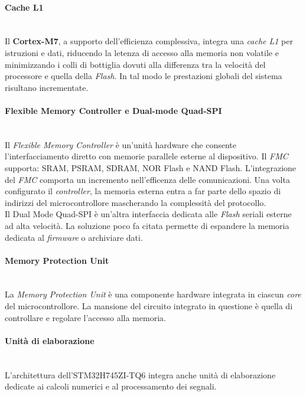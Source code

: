 \paragraph{\small{Cache L1}}\mbox{}\\
Il \textbf{Cortex-M7}, a supporto dell'efficienza complessiva, integra una \textit{cache L1} per istruzioni e dati, riducendo la letenza di accesso alla memoria non volatile e minimizzando i colli di bottiglia dovuti alla differenza tra la velocità del processore e quella della \textit{Flash}. In tal modo le prestazioni globali del sistema risultano incrementate.

\paragraph{\small{Flexible Memory Controller e Dual-mode Quad-SPI}}\mbox{}\\
Il \textit{Flexible Memory Controller} è un'unità hardware che consente l'interfacciamento diretto con memorie parallele esterne al dispositivo. Il \textit{FMC} supporta: SRAM, PSRAM, SDRAM, NOR Flash e NAND Flash. L'integrazione del \textit{FMC} comporta un incremento nell'efficenza delle comunicazioni. Una volta configurato il
\textit{controller}, la memoria esterna entra a far parte dello spazio di indirizzi del microcontrollore mascherando la complessità del protocollo.\\
Il Dual Mode Quad-SPI è un'altra interfaccia dedicata alle \textit{Flash} seriali esterne ad alta velocità. La soluzione poco fa citata permette di espandere la memoria dedicata al \textit{firmware} o archiviare dati.

\paragraph{\small{Memory Protection Unit}}\mbox{}\\
La \textit{Memory Protection Unit} è una componente hardware integrata in ciascun \textit{core} del microcontrollore. La mansione del circuito integrato in questione è quella di controllare e regolare l'accesso alla memoria. 

\paragraph{Unità di elaborazione}\mbox{}\\
L'architettura dell'STM32H745ZI-TQ6 integra anche unità di elaborazione dedicate ai calcoli numerici e al processamento dei segnali.

